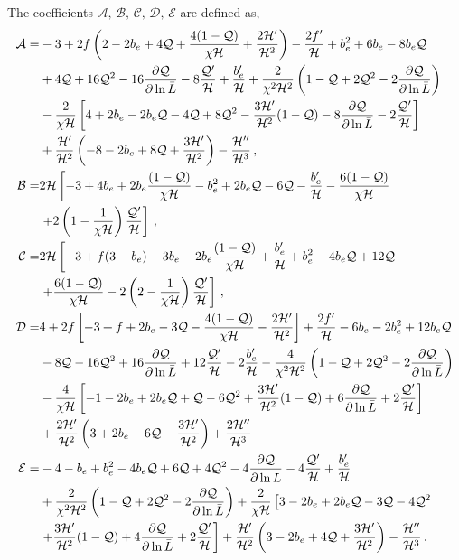 The coefficients $\mathcal{A},\,\mathcal{B},\,\mathcal{C},\,\mathcal{D},\,\mathcal{E}$ are defined as, 
\begin{align}
	\mathcal{A} =& -3 + 2f \left(2 - 2b_e + 4 \mathcal{Q} + \frac{4(1-\mathcal{Q})}{\chi\mathcal{H}} + \frac{2\mathcal{H}'}{\mathcal{H}^{2}} \right) -\frac{2f'}{\mathcal{H}} + b_e^2 + 6 b_e - 8 b_e \mathcal{Q} \nonumber \\
	& + 4 \mathcal{Q} + 16 \mathcal{Q}^2 - 16\frac{\partial \mathcal{Q}}{\partial \ln\bar{L}} -8 \frac{\mathcal{Q}'}{\mathcal{H}} + \frac{b_e'}{\mathcal{H}} + \frac{2}{\chi^{2}\mathcal{H}^2} \left(1 - \mathcal{Q} + 2\mathcal{Q}^2 - 2\frac{\partial \mathcal{Q}}{\partial \ln{\bar{L}}} \right) \nonumber \\
	& - \frac{2}{\chi \mathcal{H}} \left[ 4 + 2b_e - 2 b_e \mathcal{Q} - 4\mathcal{Q} + 8\mathcal{Q}^2 - \frac{3\mathcal{H}'}{\mathcal{H}^2}(1 - \mathcal{Q}) - 8\frac{\partial \mathcal{Q}}{\partial \ln{\bar{L}}} - 2\frac{\mathcal{Q}'}{\mathcal{H}} \right] \nonumber \\
	& + \frac{\mathcal{H}'}{\mathcal{H}^2} \left(-8 - 2b_e + 8\mathcal{Q} + \frac{3\mathcal{H}'}{\mathcal{H}^2} \right) - \frac{\mathcal{H}''}{\mathcal{H}^3}\,,\label{eq:bcA} \\
	\mathcal{B} =& 2\mathcal{H} \left[ -3 + 4 b_e + 2b_e \frac{(1 - \mathcal{Q})}{\chi \mathcal{H}} -b_e^2 + 2b_e \mathcal{Q} - 6\mathcal{Q} - \frac{b_e'}{\mathcal{H}} - \frac{6( 1 - \mathcal{Q})}{\chi\mathcal{H}} \right. \nonumber \\
	& \left. + 2\left(1 - \frac{1}{\chi\mathcal{H}} \right) \frac{\mathcal{Q}'}{\mathcal{H}} \right]\,,\\
	\mathcal{C} =& 2\mathcal{H} \left[ -3 + f(3 - b_e) - 3b_e - 2 b_e \frac{(1 - \mathcal{Q})}{\chi\mathcal{H}} + \frac{b_e'}{\mathcal{H}} + b_e^2 - 4 b_e \mathcal{Q} + 12\mathcal{Q} \right. \nonumber \\
	&\left. + \frac{6 (1 - \mathcal{Q})}{\chi\mathcal{H}} - 2\left(2 -\frac{1}{\chi\mathcal{H}}\right) \frac{\mathcal{Q}'}{\mathcal{H}} \right]\,\label{eq:bcC}, \\
	\mathcal{D} =& 4 +2f\left[ -3 + f + 2b_e - 3\mathcal{Q} - \frac{4(1 - \mathcal{Q})}{\chi\mathcal{H}} - \frac{2\mathcal{H}'}{\mathcal{H}^2} \right] +\frac{2f'}{\mathcal{H}} - 6b_e - 2 b_e^2 + 12 b_e\mathcal{Q} \nonumber \\
	& - 8 \mathcal{Q} - 16\mathcal{Q}^2 + 16 \frac{\partial \mathcal{Q}}{\partial \ln{\bar{L}}} + 12 \frac{\mathcal{Q}'}{\mathcal{H}} - 2\frac{b_e'}{\mathcal{H}} - \frac{4}{\chi^2 \mathcal{H}^2} \left(1 - \mathcal{Q} + 2\mathcal{Q}^2 - 2 \frac{\partial \mathcal{Q}}{\partial \ln{\bar{L}}} \right) \nonumber \\
	& - \frac{4}{\chi \mathcal{H}} \left[ -1 -2b_e + 2b_e\mathcal{Q} + \mathcal{Q} - 6\mathcal{Q}^2 + \frac{3\mathcal{H}'}{\mathcal{H}^2}(1 - \mathcal{Q}) + 6 \frac{\partial \mathcal{Q}}{\partial \ln{\bar{L}}} + 2\frac{\mathcal{Q}'}{\mathcal{H}} \right] \nonumber \\
	&+ \frac{2\mathcal{H}'}{\mathcal{H}^2} \left(3 + 2b_e - 6\mathcal{Q} - \frac{3\mathcal{H}'}{\mathcal{H}^2} \right) + \frac{2\mathcal{H}''}{\mathcal{H}^3} \\
	\mathcal{E} =& -4 - b_e + b_e^2 - 4b_e\mathcal{Q} + 6 \mathcal{Q} + 4\mathcal{Q}^2 - 4\frac{\partial \mathcal{Q}}{\partial \ln{\bar{L}}} - 4\frac{\mathcal{Q}'}{\mathcal{H}} + \frac{b_e'}{\mathcal{H}} \nonumber \\
	&+ \frac{2}{\chi^2\mathcal{H}^2} \left(1 - \mathcal{Q} + 2\mathcal{Q}^2 - 2\frac{\partial \mathcal{Q}}{\partial \ln{\bar{L}}}\right) + \frac{2}{\chi\mathcal{H}} \left[3 - 2b_e + 2b_e \mathcal{Q} - 3\mathcal{Q} - 4\mathcal{Q}^2 \right. \nonumber \\
	&\left. + \frac{3\mathcal{H}'}{\mathcal{H}^2} (1 - \mathcal{Q}) + 4\frac{\partial \mathcal{Q}}{\partial \ln{\bar{L}}} + 2\frac{\mathcal{Q}'}{\mathcal{H}} \right] + \frac{\mathcal{H}'}{\mathcal{H}^2} \left(3 - 2b_e + 4\mathcal{Q} + \frac{3\mathcal{H}'}{\mathcal{H}^2} \right) - \frac{\mathcal{H}''}{\mathcal{H}^3}\,.
\end{align}
